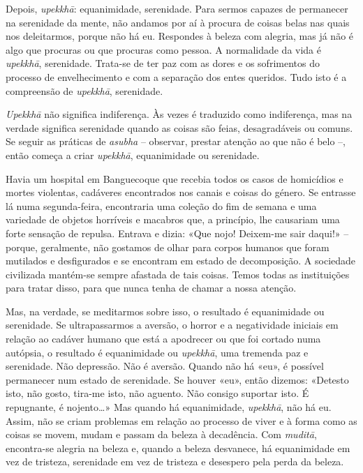 Depois, \emph{upekkhā}: equanimidade, serenidade. Para sermos capazes de
permanecer na serenidade da mente, não andamos por aí à procura de coisas belas
nas quais nos deleitarmos, porque não há eu. Respondes à beleza com alegria, mas
já não é algo que procuras ou que procuras como pessoa. A normalidade da vida é
\emph{upekkhā}, serenidade. Trata-se de ter paz com as dores e os sofrimentos
do processo de envelhecimento e com a separação dos entes queridos. Tudo isto é
a compreensão de \emph{upekkhā}, serenidade.

\emph{Upekkhā} não significa indiferença. Às vezes é traduzido como indiferença,
mas na verdade significa serenidade quando as coisas são feias, desagradáveis ou
comuns. Se seguir as práticas de \emph{asubha} -- observar, prestar atenção ao
que não é belo --, então começa a criar \emph{upekkhā}, equanimidade ou
serenidade.

Havia um hospital em Banguecoque que recebia todos os casos de homicídios e
mortes violentas, cadáveres encontrados nos canais e coisas do género. Se
entrasse lá numa segunda-feira, encontraria uma coleção do fim de semana e uma
variedade de objetos horríveis e macabros que, a princípio, lhe causariam uma
forte sensação de repulsa. Entrava e dizia: «Que nojo! Deixem-me sair daqui!»
-- porque, geralmente, não gostamos de olhar para corpos humanos que foram
mutilados e desfigurados e se encontram em estado de decomposição. A sociedade
civilizada mantém-se sempre afastada de tais coisas. Temos todas as
instituições para tratar disso, para que nunca tenha de chamar a nossa atenção.

Mas, na verdade, se meditarmos sobre isso, o resultado é equanimidade ou
serenidade. Se ultrapassarmos a aversão, o horror e a negatividade iniciais em
relação ao cadáver humano que está a apodrecer ou que foi cortado numa autópsia,
o resultado é equanimidade ou \emph{upekkhā}, uma tremenda paz e serenidade. Não
depressão. Não é aversão. Quando não há «eu», é possível permanecer num estado
de serenidade. Se houver «eu», então dizemos: «Detesto isto, não gosto, tira-me
isto, não aguento. Não consigo suportar isto. É repugnante, é nojento\ldots{}»
Mas quando há equanimidade, \emph{upekkhā}, não há eu. Assim, não se criam
problemas em relação ao processo de viver e à forma como as coisas se movem,
mudam e passam da beleza à decadência. Com \emph{muditā}, encontra-se alegria
na beleza e, quando a beleza desvanece, há equanimidade em vez de tristeza,
serenidade em vez de tristeza e desespero pela perda da beleza.

